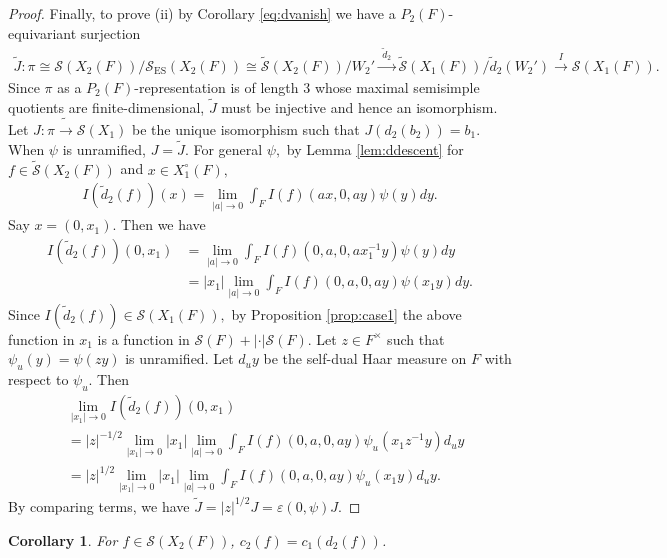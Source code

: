 \documentclass[11pt,a4paper,reqno]{amsart}
\newtheorem{cor}[thm]{Corollary}
\theoremstyle{remark}
\numberwithin{equation}{section}
\theoremstyle{definition}
\numberwithin{equation}{section}
\begin{document}
\begin{proof}
Finally, to prove (ii) by Corollary \ref{eq:dvanish} we have a $P_{2}(F)$-equivariant surjection
    \begin{align*}
        \tilde{J}:\pi\cong \mathcal{S}(X_{2}(F))/\mathcal{S}_{\mathrm{ES}}(X_{2}(F))\cong \widetilde{\mathcal{S}}(X_{2}(F))/W_2'\xrightarrow{\,\,\tilde{d}_2\,\,} \widetilde{\mathcal{S}}(X_{1}(F))/\tilde{d}_2(W_2')\xrightarrow{\,\, I\,\,} \mathcal{S}(X_{1}(F)).
    \end{align*}
     Since $\pi$ as a $P_2(F)$-representation is of length $3$ whose maximal semisimple quotients are finite-dimensional,  $\tilde{J}$ must be injective and hence an isomorphism.  Let $J:\pi\tilde{\longrightarrow} \mathcal{S}(X_1)$ be the unique isomorphism such that $J(d_2(b_2))=b_1$. When $\psi$ is unramified, $J=\tilde{J}.$ For general $\psi,$ by Lemma \ref{lem:ddescent} for $f\in \widetilde{\mathcal{S}}(X_{2}(F))$ and $x\in X_{1}^\circ(F),$
    \begin{align*}
        I(\tilde{d}_2(f))(x)=\lim_{|a|\to 0} \int_{F} I(f)(ax,0,ay) \psi(y)dy.
    \end{align*}
    Say $x=(0,x_1)$. Then we have
    \begin{align*}
        I(\tilde{d}_2(f))(0,x_1)&=\lim_{|a|\to 0} \int_{F} I(f)(0,a,0,ax_1^{-1}y) \psi(y)dy\\
        &=|x_1|\lim_{|a|\to 0} \int_{F} I(f)(0,a,0,ay) \psi(x_1y)dy.
    \end{align*}
     Since $I(\tilde{d}_2(f))\in \mathcal{S}(X_1(F)),$ by Proposition \ref{prop:case1} the above function in $x_1$ is a function in $\mathcal{S}(F)+|\cdot| \mathcal{S}(F)$.  Let $z\in F^\times$ such that $\psi_u(y)=\psi(zy)$ is unramified. Let $d_u y$ be the self-dual Haar measure on $F$ with respect to $\psi_u$. Then 
    \begin{align*}
       &\lim_{|x_1|\to 0}I(\tilde{d}_2(f))(0,x_1)\\
       &=|z|^{-1/2}\lim_{|x_1|\to 0}|x_1|\lim_{|a|\to 0} \int_{F} I(f)(0,a,0,ay) \psi_u(x_1z^{-1}y)d_uy\\
       &=|z|^{1/2}\lim_{|x_1|\to 0}|x_1|\lim_{|a|\to 0} \int_{F} I(f)(0,a,0,ay) \psi_u(x_1y)d_uy.
    \end{align*}
    By comparing terms, we have $\tilde{J}=|z|^{1/2}J=\varepsilon(0,\psi)J.$    
\end{proof}


\begin{cor}\label{cor:2eq1}
For $f\in \mathcal{S}(X_{2}(F))$, $c_2(f)=c_1(d_2(f))$.
\end{cor}
\end{document}
